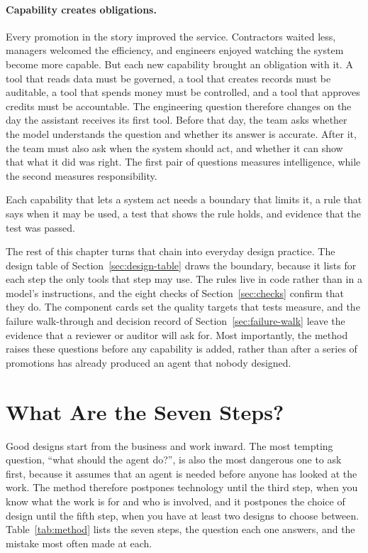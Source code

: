 \paragraph{Capability creates obligations.} Every promotion in the story improved the service. Contractors waited less, managers welcomed the efficiency, and engineers enjoyed watching the system become more capable. But each new capability brought an obligation with it. A tool that reads data must be governed, a tool that creates records must be auditable, a tool that spends money must be controlled, and a tool that approves credits must be accountable. The engineering question therefore changes on the day the assistant receives its first tool. Before that day, the team asks whether the model understands the question and whether its answer is accurate. After it, the team must also ask when the system should act, and whether it can show that what it did was right. The first pair of questions measures intelligence, while the second measures responsibility.

\begin{principle}
Each capability that lets a system act needs a boundary that limits it, a rule that says when it may be used, a test that shows the rule holds, and evidence that the test was passed.
\end{principle}

The rest of this chapter turns that chain into everyday design practice. The design table of Section~\ref{sec:design-table} draws the boundary, because it lists for each step the only tools that step may use. The rules live in code rather than in a model's instructions, and the eight checks of Section~\ref{sec:checks} confirm that they do. The component cards set the quality targets that tests measure, and the failure walk-through and decision record of Section~\ref{sec:failure-walk} leave the evidence that a reviewer or auditor will ask for. Most importantly, the method raises these questions before any capability is added, rather than after a series of promotions has already produced an agent that nobody designed.

\section{What Are the Seven Steps?}
\label{sec:method}

Good designs start from the business and work inward. The most tempting question, ``what should the agent do?'', is also the most dangerous one to ask first, because it assumes that an agent is needed before anyone has looked at the work. The method therefore postpones technology until the third step, when you know what the work is for and who is involved, and it postpones the choice of design until the fifth step, when you have at least two designs to choose between. Table~\ref{tab:method} lists the seven steps, the question each one answers, and the mistake most often made at each.

